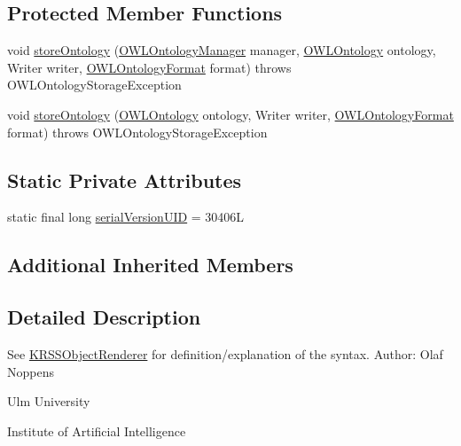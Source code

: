 \subsection*{Protected Member Functions}
\begin{DoxyCompactItemize}
\item 
void \hyperlink{classde_1_1uulm_1_1ecs_1_1ai_1_1owlapi_1_1krssrenderer_1_1_k_r_s_s_syntax_ontology_storer_afeb4a548f2616dfdce53c3a647f64153}{store\-Ontology} (\hyperlink{interfaceorg_1_1semanticweb_1_1owlapi_1_1model_1_1_o_w_l_ontology_manager}{O\-W\-L\-Ontology\-Manager} manager, \hyperlink{interfaceorg_1_1semanticweb_1_1owlapi_1_1model_1_1_o_w_l_ontology}{O\-W\-L\-Ontology} ontology, Writer writer, \hyperlink{classorg_1_1semanticweb_1_1owlapi_1_1model_1_1_o_w_l_ontology_format}{O\-W\-L\-Ontology\-Format} format)  throws O\-W\-L\-Ontology\-Storage\-Exception 
\item 
void \hyperlink{classde_1_1uulm_1_1ecs_1_1ai_1_1owlapi_1_1krssrenderer_1_1_k_r_s_s_syntax_ontology_storer_a91705420c8b91ae3654a77d24589e55a}{store\-Ontology} (\hyperlink{interfaceorg_1_1semanticweb_1_1owlapi_1_1model_1_1_o_w_l_ontology}{O\-W\-L\-Ontology} ontology, Writer writer, \hyperlink{classorg_1_1semanticweb_1_1owlapi_1_1model_1_1_o_w_l_ontology_format}{O\-W\-L\-Ontology\-Format} format)  throws O\-W\-L\-Ontology\-Storage\-Exception 
\end{DoxyCompactItemize}
\subsection*{Static Private Attributes}
\begin{DoxyCompactItemize}
\item 
static final long \hyperlink{classde_1_1uulm_1_1ecs_1_1ai_1_1owlapi_1_1krssrenderer_1_1_k_r_s_s_syntax_ontology_storer_a1d0baebad28b354bc54398b49bc50ab4}{serial\-Version\-U\-I\-D} = 30406\-L
\end{DoxyCompactItemize}
\subsection*{Additional Inherited Members}


\subsection{Detailed Description}
See \hyperlink{classde_1_1uulm_1_1ecs_1_1ai_1_1owlapi_1_1krssrenderer_1_1_k_r_s_s_object_renderer}{K\-R\-S\-S\-Object\-Renderer} for definition/explanation of the syntax. Author\-: Olaf Noppens\par
 Ulm University\par
 Institute of Artificial Intelligence\par
 

